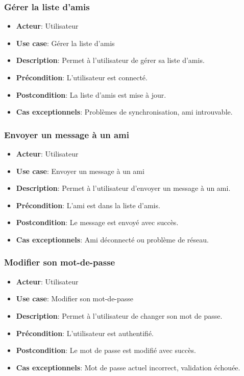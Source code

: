 \documentclass{article}
\begin{document}
\subsubsection*{Gérer la liste d'amis}
\begin{itemize}
    \item \textbf{Acteur}: Utilisateur
    \item \textbf{Use case}: Gérer la liste d'amis
    \item \textbf{Description}: Permet à l'utilisateur de gérer sa liste d'amis.
    \item \textbf{Précondition}: L'utilisateur est connecté.
    \item \textbf{Postcondition}: La liste d'amis est mise à jour.
    \item \textbf{Cas exceptionnels}: Problèmes de synchronisation, ami introuvable.
\end{itemize}

\subsubsection*{Envoyer un message à un ami}
\begin{itemize}
    \item \textbf{Acteur}: Utilisateur
    \item \textbf{Use case}: Envoyer un message à un ami
    \item \textbf{Description}: Permet à l'utilisateur d'envoyer un message à un ami.
    \item \textbf{Précondition}: L'ami est dans la liste d'amis.
    \item \textbf{Postcondition}: Le message est envoyé avec succès.
    \item \textbf{Cas exceptionnels}: Ami déconnecté ou problème de réseau.
\end{itemize}

\subsubsection*{Modifier son mot-de-passe}
\begin{itemize}
    \item \textbf{Acteur}: Utilisateur
    \item \textbf{Use case}: Modifier son mot-de-passe
    \item \textbf{Description}: Permet à l'utilisateur de changer son mot de passe.
    \item \textbf{Précondition}: L'utilisateur est authentifié.
    \item \textbf{Postcondition}: Le mot de passe est modifié avec succès.
    \item \textbf{Cas exceptionnels}: Mot de passe actuel incorrect, validation échouée.
\end{itemize}
\end{document}
